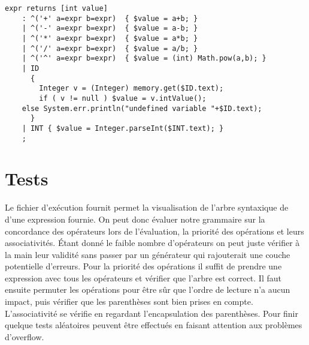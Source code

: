 \documentclass[paper=a4, fontsize=11pt]{scrartcl} %
\numberwithin{equation}{section} %
\numberwithin{figure}{section} %
\numberwithin{table}{section} %
\begin{document}
\begin{lstlisting}[label=eval_file,caption=Fichier Eval.g,
linebackgroundcolor={\lstcolorlines[orange!30]{6}\lstcolorlines[blue!30]{5}}]
expr returns [int value]
    : ^('+' a=expr b=expr)  { $value = a+b; }
    | ^('-' a=expr b=expr)  { $value = a-b; }
    | ^('*' a=expr b=expr)  { $value = a*b; }
    | ^('/' a=expr b=expr)  { $value = a/b; }
    | ^('^' a=expr b=expr)  { $value = (int) Math.pow(a,b); }
    | ID
      {
        Integer v = (Integer) memory.get($ID.text);
        if ( v != null ) $value = v.intValue();
	else System.err.println("undefined variable "+$ID.text);
      }
    | INT { $value = Integer.parseInt($INT.text); }
    ;
\end{lstlisting}




\section{Tests}

Le fichier d'exécution fournit permet la visualisation de l'arbre syntaxique de
d'une expression fournie. On peut donc évaluer notre grammaire sur la
concordance des opérateurs lors de l'évaluation, la priorité des opérations et
leurs associativités. Étant donné le faible nombre d'opérateurs on peut juste
vérifier à la main leur validité sans passer par un générateur qui rajouterait
une couche potentielle d'erreurs. Pour la priorité des opérations il suffit de
prendre une expression avec tous les opérateurs et vérifier que l'arbre est
correct. Il faut ensuite permuter les opérations pour être sûr que l'ordre de
lecture n'a aucun impact, puis vérifier que les parenthèses sont bien prises en
compte. L'associativité se vérifie en regardant l'encapsulation des parenthèses.
Pour finir quelque tests aléatoires peuvent être effectués en faisant attention
aux problèmes d'overflow.
\end{document}
